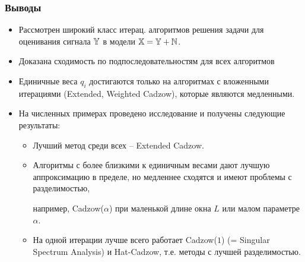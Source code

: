 \documentclass[unicode, notheorems]{beamer}
\begin{document}
%  


\begin{frame}
	\frametitle{Выводы}\footnotesize
	\begin{itemize}
		\item Рассмотрен широкий класс итерац. алгоритмов решения задачи 
		для оценивания сигнала $\mathbb{Y}$  в модели $\mathbb{X} = \mathbb{Y} + \mathbb{N}$.
		\item Доказана сходимость по подпоследовательностям для всех алгоритмов
		\item Единичные веса $q_i$ достигаются только на алгоритмах с вложенными итерациями (Extended, Weighted Cadzow), которые являются медленными.
		\item  На численных примерах проведено исследование и получены следующие результаты:
		\begin{itemize} \footnotesize
			\item Лучший метод среди всех -- Extended Cadzow.
			\item Алгоритмы с более близкими к единичным весами дают лучшую аппроксимацию в пределе, но медленнее сходятся и имеют проблемы с разделимостью,
			
			например, Cadzow($\alpha$) при маленькой  длине окна $L$ или малом параметре $\alpha$.
			\item На одной итерации лучше всего работает Cadzow($1$) (= Singular Spectrum Analysis) и Hat-Cadzow, т.е. методы с лучшей разделимостью.
		\end{itemize}
	\end{itemize}
	
\end{frame}


\end{document}
